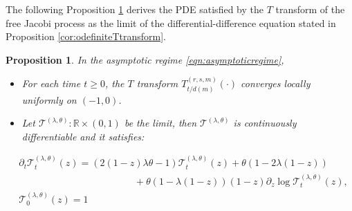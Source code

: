 \documentclass[12pt,reqno]{amsart}
\newtheorem{proposition}{Proposition}
\begin{document}
The following Proposition \ref{thm:PDEfromfinitefree} derives the PDE satisfied by the $T$ transform of the free Jacobi
process as the limit of the differential-difference equation stated in Proposition \ref{cor:odefiniteTtransform}.
\begin{proposition}
	\label{thm:PDEfromfinitefree}
	In the asymptotic regime \eqref{eqn:asymptoticregime},
	\begin{itemize}
		\item For each time $t\geq 0$, the $T$ transform $T^{(r,s,m)}_{t/d(m)}(\cdot)$ converges locally uniformly on $(-1,0)$.
		\item Let $\mathcal{T}^{(\lambda,\theta)}\colon \mathbb{R}\times (0,1) $ be the limit, then $\mathcal{T}^{(\lambda,\theta)}$ is continuously differentiable and it satisfies:
	\end{itemize}
	\begin{align*}
		&\partial_t \mathcal{T}_t^{(\lambda,\theta)}(z) = (2(1-z)\lambda\theta -1)\mathcal{T}_t^{(\lambda,\theta)}(z) + \theta(1-2\lambda (1-z)) \\
		&\hspace{5cm}+ \theta(1-\lambda{(1-z)})(1-z){\partial_{z}\log \mathcal{T}_t^{(\lambda,\theta)}(z)}, \\
		&\mathcal{T}_0^{(\lambda,\theta)}(z) = 1
	\end{align*}
\end{proposition}
\end{document}
